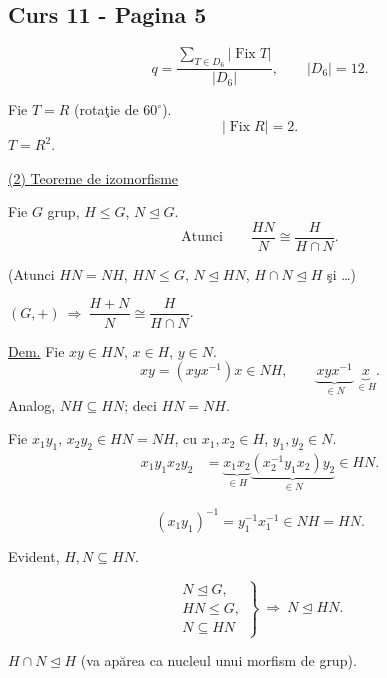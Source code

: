 
\subsection*{Curs 11 - Pagina 5}

\[
q=\frac{\displaystyle\sum_{T\in D_6}|\operatorname{Fix}T|}
        {|D_6|},\qquad |D_6|=12.
\]

\noindent Fie $T=R$ (rota\c{t}ie de $60^\circ$).
\[
|\operatorname{Fix}R|=2.
\]
\noindent $T=R^2$.

\bigskip
\noindent\underline{(2) Teoreme de izomorfisme}

\medskip
\noindent{}

\bigskip
\noindent Fie $G$ grup, $H\leq G$, $N\trianglelefteq G$.
\[
\text{Atunci}\qquad \boxed{\frac{HN}{N}\cong\frac{H}{H\cap N}}.
\]

\noindent (Atunci $HN=NH$, $HN\leq G$, $N\trianglelefteq HN$,
$H\cap N\trianglelefteq H$ \c{s}i \ldots)

\medskip
\noindent $(G,+)\ \Rightarrow\ \dfrac{H+N}{N}\cong\dfrac{H}{H\cap N}$.

\bigskip
\noindent\underline{Dem.}
Fie $xy\in HN$, $x\in H$, $y\in N$.
\[
xy=(xyx^{-1})x\in NH,
\qquad
\underbrace{xyx^{-1}}_{\in N}\ \underbrace{x}_{\in H}.
\]
\noindent Analog, $NH\subseteq HN$; deci $HN=NH$.

\bigskip
\noindent Fie $x_1y_1,\,x_2y_2\in HN=NH$, cu
$x_1,x_2\in H$, $y_1,y_2\in N$.
\[
\begin{aligned}
x_1y_1x_2y_2
 &=\underbrace{x_1x_2}_{\in H}
   \underbrace{(x_2^{-1}y_1x_2)y_2}_{\in N}
   \in HN.
\end{aligned}
\]

\[
(x_1y_1)^{-1}=y_1^{-1}x_1^{-1}\in NH=HN.
\]

\noindent Evident, $H,N\subseteq HN$.

\[
\left.\begin{gathered}
N\trianglelefteq G,\\
HN\leq G,\\
N\subseteq HN
\end{gathered}\right\}
\ \Longrightarrow\ N\trianglelefteq HN.
\]

\noindent $H\cap N\trianglelefteq H$
(va ap\u{a}rea ca nucleul unui morfism de grup).
